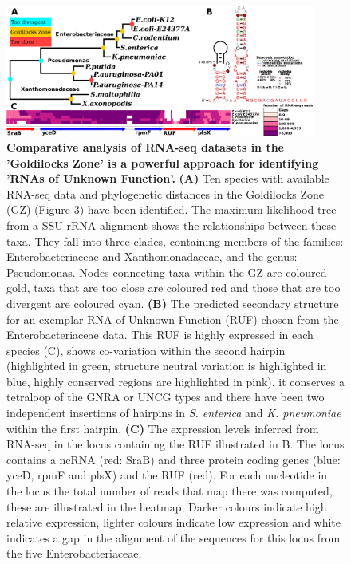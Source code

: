 \documentclass[10pt]{article}
\begin{document}
\begin{figure}[!ht]
\begin{center}
\includegraphics[width=4in]{figures/figure4.pdf}
\end{center}
\caption{ {\bf Comparative analysis of RNA-seq datasets in the
    'Goldilocks Zone' is a powerful approach for identifying 'RNAs of
    Unknown Function'.} {\bf (A)} Ten species with available RNA-seq data
  and phylogenetic distances in the Goldilocks Zone (GZ) (Figure 3)
  have been identified. The maximum likelihood tree from a SSU rRNA
  alignment shows the relationships between these taxa. They fall into
  three clades, containing members of the families: Enterobacteriaceae
  and Xanthomonadaceae, and the genus: Pseudomonas. Nodes connecting
  taxa within the GZ are coloured gold, taxa that are too close are
  coloured red and those that are too divergent are coloured cyan. {\bf (B)}
  The predicted secondary structure for an exemplar RNA of Unknown
  Function (RUF) chosen from the Enterobacteriaceae data. This RUF is
  highly expressed in each species (C), shows co-variation within the
  second hairpin (highlighted in green, structure neutral variation is
  highlighted in blue, highly conserved regions are highlighted in
  pink), it conserves a tetraloop of the GNRA or UNCG types and there
  have been two independent insertions of hairpins in \emph{S. enterica}
  and \emph{K. pneumoniae} within the first hairpin. {\bf (C)} The expression
  levels inferred from RNA-seq in the locus containing the RUF
  illustrated in B. The locus contains a ncRNA (red: SraB) and three
  protein coding genes (blue: yceD, rpmF and plsX) and the RUF
  (red). For each nucleotide in the locus the total number of reads
  that map there was computed, these are illustrated in the heatmap;
  Darker colours indicate high relative expression, lighter colours
  indicate low expression and white indicates a gap in the alignment
  of the sequences for this locus from the five Enterobacteriaceae.}
\label{fig:4}
\end{figure}



\end{document}
